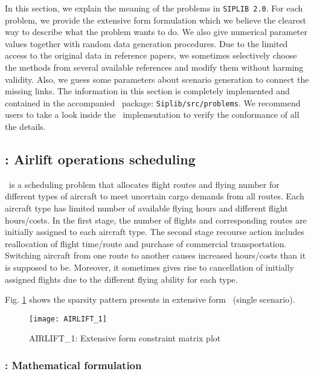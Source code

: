In this section, we explain the meaning of the problems in \texttt{SIPLIB 2.0}. For each problem, we provide the extensive form formulation which we believe the clearest way to describe what the problem wants to do. We also give numerical parameter values together with random data generation procedures. Due to the limited access to the original data in reference papers, we sometimes selectively choose the methods from several available references and modify them without harming validity. Also, we guess some parameters about scenario generation to connect the missing links. The information in this section is completely implemented and contained in the accompanied \julia\ package: \texttt{Siplib/src/problems}. We recommend users to take a look inside the \julia\ implementation to verify the conformance of all the details.

\subsection{\airlift: Airlift operations scheduling} \label{AIRLIFT}
\airlift\ is a scheduling problem that allocates flight routes and flying number for different types of aircraft to meet uncertain cargo demands from all routes. Each aircraft type has limited number of available flying hours and different flight hours/costs. In the first stage, the number of flights and corresponding routes are initially assigned to each aircraft type. The second stage recourse action includes reallocation of flight time/route and purchase of commercial transportation. Switching aircraft from one route to another causes increased hours/costs than it is supposed to be. Moreover, it sometimes gives rise to cancellation of initially assigned flights due to the different flying ability for each type.    

Fig. \ref{fig:airlift_sparsity} shows the sparsity pattern presents in extensive form \airlift\ (single scenario).
\begin{figure}[H]
	\centering
	\texttt{[image: AIRLIFT\_1]}
	\caption{AIRLIFT\_1: Extensive form constraint matrix plot}
	\label{fig:airlift_sparsity}
\end{figure}
\subsubsection{\airlift: Mathematical formulation}


